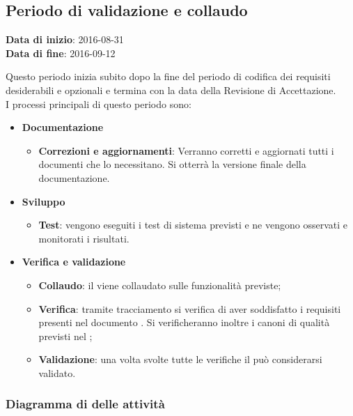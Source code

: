 	\subsection{Periodo di validazione e collaudo}
	\begin{center}
		\textbf{Data di inizio}: 2016-08-31 \\
		\textbf{Data di fine}: 2016-09-12 \\
	\end{center}
	Questo periodo inizia subito dopo la fine del periodo di codifica dei requisiti desiderabili e opzionali e termina con la data della Revisione di Accettazione. \\
	I processi principali di questo periodo sono:
		\begin{itemize}
			\item \textbf{Documentazione}
			\att
			\begin{itemize}
				\item \textbf{Correzioni e aggiornamenti}: Verranno corretti e aggiornati tutti i documenti che lo necessitano. Si otterrà la versione finale della documentazione. 
			\end{itemize}
			\item \textbf{Sviluppo}
			\att
				\begin{itemize}
					\item \textbf{Test}: vengono eseguiti i test di sistema previsti e ne vengono osservati e monitorati i risultati. 
				\end{itemize}
			\item \textbf{Verifica e validazione}
			\att
			\begin{itemize}
				\item \textbf{Collaudo}: il  viene collaudato sulle funzionalità previste;
				\item \textbf{Verifica}: tramite tracciamento si verifica di aver soddisfatto i requisiti presenti nel documento \ARdocRA. Si verificheranno inoltre i canoni di qualità previsti nel \PQdocRA;
				\item \textbf{Validazione}: una volta svolte tutte le verifiche il  può considerarsi validato.
			\end{itemize}
		\end{itemize}
		\subsubsection{Diagramma di  delle attività}
		
